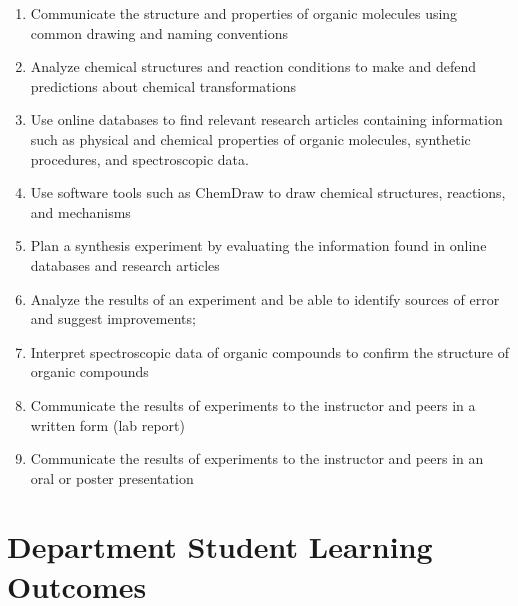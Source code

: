 \begin{enumerate}
\def\labelenumi{\arabic{enumi}.}
\tightlist
\item
  Communicate the structure and properties of organic molecules using
  common drawing and naming conventions
\item
  Analyze chemical structures and reaction conditions to make and defend
  predictions about chemical transformations
\item
  Use online databases to find relevant research articles containing
  information such as physical and chemical properties of organic
  molecules, synthetic procedures, and spectroscopic data.
\item
  Use software tools such as ChemDraw to draw chemical structures,
  reactions, and mechanisms
\item
  Plan a synthesis experiment by evaluating the information found in
  online databases and research articles
\item
  Analyze the results of an experiment and be able to identify sources
  of error and suggest improvements;
\item
  Interpret spectroscopic data of organic compounds to confirm the
  structure of organic compounds
\item
  Communicate the results of experiments to the instructor and peers in
  a written form (lab report)
\item
  Communicate the results of experiments to the instructor and peers in
  an oral or poster presentation
\end{enumerate}

\hypertarget{department-student-learning-outcomes}{%
\section{Department Student Learning
Outcomes}\label{department-student-learning-outcomes}}


